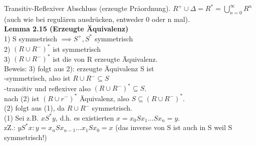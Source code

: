 \documentclass{article}
\begin{document}
	Transitiv-Reflexiver Abschluss (erzeugte Präordnung).
	$R^+\cup \Delta = R^*=\bigcup\limits^\infty_{n=0}R^n$ (auch wie bei regulären ausdrücken, entweder 0 oder n mal).\\
	\textbf{Lemma 2.15 (Erzeugte Äquivalenz)}\\
	1) S symmetrisch $\implies S^+, S^*$ symmetrisch\\
	2) $(R\cup R^-)^*$ ist symmetrisch\\
	3) $(R\cup R^-)^*$ ist die von R erzeugte Äquivalenz.\\
	Beweis: 3) folgt aus 2): erzeugte Äquivalenz S ist\\
	-symmetrisch, also ist $R\cup R^-\subseteq S$\\
	-transitiv und reflexiver also $(R\cup R^-)^*\subseteq S$.\\
	nach (2) ist $(R\cup r^-)^*$ Äquivalenz, also $S\subseteq (R\cup R^-)^*$.\\
	(2) folgt aus (1), da $R\cup R^-$ symmetrisch.\\
	(1) Sei z.B. $xS^*y$, d.h. es existierten $x=x_0Sx_1\dots Sx_n=y$.\\
	zZ.: $yS^*x: y=x_nSx_{n-1}\dots x_1Sx_0=x$ (das inverse von S ist auch in S weil S symmetrisch!)\\
	
\end{document}
